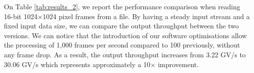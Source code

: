 On Table \ref{tab:results_2}, we report the performance comparison when reading 16-bit 1024$\times$1024 pixel frames from a file. By having a steady input stream and a fixed input data size, we can compare the output throughput between the two versions. We can notice that the introduction of our software optimisations allow the processing of 1,000 frames per second compared to 100 previously, without any frame drop. As a result, the output throughput increases from 3.22 GV/s to 30.06 GV/s which represents approximately a 10$\times$ improvement.